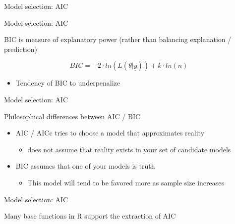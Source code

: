 \documentclass[ignorenonframetext,]{beamer}
\providecommand{\tightlist}{%
  \setlength{\itemsep}{0pt}\setlength{\parskip}{0pt}}
\begin{document}
\begin{frame}[fragile]
\begin{block}{Model selection: AIC}
\end{block}

\begin{block}{Model selection: AIC}

BIC is measure of explanatory power (rather than balancing explanation /
prediction)

\[BIC = -2\cdot ln\left( L(\underline { \theta } |\underline { y  } ) \right) + k\cdot ln(n)\]

\begin{itemize}
\tightlist
\item
  Tendency of BIC to underpenalize
\end{itemize}

\end{block}

\begin{block}{Model selection: AIC}

Philosophical differences between AIC / BIC

\begin{itemize}
\tightlist
\item
  AIC / AICc tries to choose a model that approximates reality

  \begin{itemize}
  \tightlist
  \item
    does not assume that reality exists in your set of candidate models
  \end{itemize}
\item
  BIC assumes that one of your models is truth

  \begin{itemize}
  \tightlist
  \item
    This model will tend to be favored more as sample size increases
  \end{itemize}
\end{itemize}

\end{block}

\begin{block}{Model selection: AIC}

Many base functions in R support the extraction of AIC


\end{block}
\end{frame}
\end{document}
